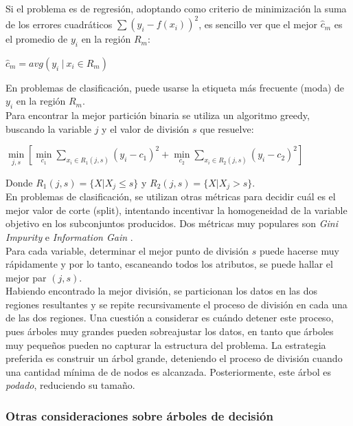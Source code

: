 Si el problema es de regresión, adoptando como criterio de minimización la suma de los errores cuadráticos $\sum\limits(y_i - f(x_i))^2$, es sencillo ver que el mejor $\hat{c}_m$ es el promedio de $y_i$ en la región $R_m$:

\begin{center}
$\hat{c}_m = avg(y_i \ | \ x_i \in R_m)$
\end{center}

En problemas de clasificación, puede usarse la etiqueta más frecuente (moda) de $y_i$ en la región $R_m$. \\

Para encontrar la mejor partición binaria se utiliza un algoritmo greedy, buscando la variable $j$ y el valor de división $s$ que resuelve:

\begin{center}
$ \min\limits_{j,s}[ \min\limits_{c_1} \sum\limits_{x_i \in R_1(j,s)} (y_i - c_1)^2 + 	\min\limits_{c_2} \sum\limits_{x_i \in R_2(j,s)} (y_i - c_2)^2  ]$
\end{center}

Donde $R_1(j,s) = \{ X | X_j \leq s \}$ y $R_2(j,s) = \{ X | X_j > s \}$. \\

En problemas de clasificación, se utilizan otras métricas para decidir cuál es el mejor valor de corte (split), intentando incentivar la homogeneidad de la variable objetivo en los subconjuntos producidos. Dos métricas muy populares son \textit{Gini Impurity} e \textit{Information Gain} \cite{ginigain}.\\

Para cada variable, determinar el mejor punto de división $s$ puede hacerse muy rápidamente y por lo tanto, escaneando todos los atributos, se puede hallar el mejor par $(j,s)$. \\

Habiendo encontrado la mejor división, se particionan los datos en las dos regiones resultantes y se repite recursivamente el proceso de división en cada una de las dos regiones. Una cuestión a considerar es cuándo detener este proceso, pues árboles muy grandes pueden sobreajustar los datos, en tanto que árboles muy pequeños pueden no capturar la estructura del problema. La estrategia preferida es construir un árbol grande, deteniendo el proceso de división cuando una cantidad mínima de de nodos es alcanzada. Posteriormente, este árbol es \textit{podado}, reduciendo su tamaño. 


\subsubsection{Otras consideraciones sobre árboles de decisión}

